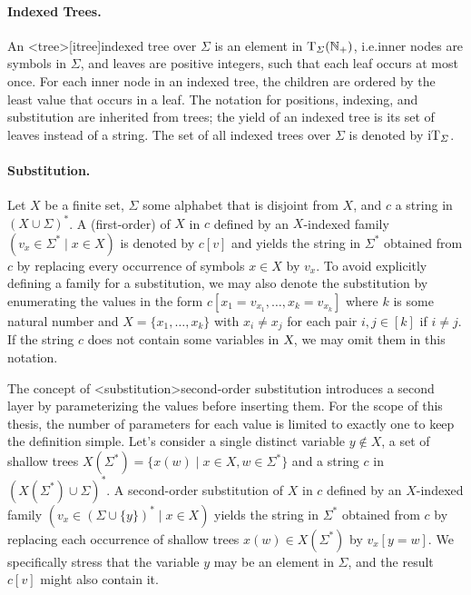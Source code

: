 \documentclass[../document.tex]{subfiles}
\begin{document}
    \paragraph{Indexed Trees.}
    An <tree>[itree]{indexed tree} over \(\varSigma\) is an element in \(\operatorname{T}_{\varSigma}(\mathbb{N}_+)\), i.e.\@ inner nodes are symbols in \(\varSigma\), and leaves are positive integers, such that each leaf occurs at most once.
    For each inner node in an indexed tree, the children are ordered by the least value that occurs in a leaf.
    The notation for positions, indexing, and substitution are inherited from trees; the yield of an indexed tree is its set of leaves instead of a string.
    The set of all indexed trees over \(\varSigma\) is denoted by \(\operatorname{iT}_\varSigma\).

    \paragraph{Substitution.}
    Let \(X\) be a finite set, \(\varSigma\) some alphabet that is disjoint from \(X\), and \(c\) a string in \((X \cup \varSigma)^*\).
    A (first-order)  of \(X\) in \(c\) defined by an \(X\)-indexed family \((v_x \in \varSigma^* \mid x \in X)\) is denoted by \(c[v]\) and yields the string in \(\varSigma^*\) obtained from \(c\) by replacing every occurrence of symbols \(x \in X\) by \(v_x\).
    To avoid explicitly defining a family for a substitution, we may also denote the substitution by enumerating the values in the form \(c[x_1=v_{x_1}, \ldots, x_{k}=v_{x_k}]\) where \(k\) is some natural number and \(X = \{x_1, \ldots, x_k\}\) with \(x_i \neq x_j\) for each pair \(i,j \in [k]\) if \(i\neq j\).
    If the string \(c\) does not contain some variables in \(\textsl{X}\), we may omit them in this notation.

    The concept of <substitution>{second-order substitution} introduces a second layer by parameterizing the values before inserting them.
    For the scope of this thesis, the number of parameters for each value is limited to exactly one to keep the definition simple.
    Let's consider a single distinct variable \(y \notin X\), a set of shallow trees \(X(\varSigma^*) = \{ x(w) \mid x \in X, w \in \Sigma^* \}\) and a string \(c\) in \((X(\varSigma^*) \cup \varSigma)^*\).
    A second-order substitution of \(X\) in \(c\) defined by an \(X\)-indexed family \((v_x \in (\varSigma \cup \{y\})^* \mid x \in X)\) yields the string in \(\varSigma^*\) obtained from \(c\) by replacing each occurrence of shallow trees \(x(w) \in X(\varSigma^*)\) by \(v_x[y=w]\).
    We specifically stress that the variable \(y\) may be an element in \(\varSigma\), and the result \(c[v]\) might also contain it.
\end{document}
